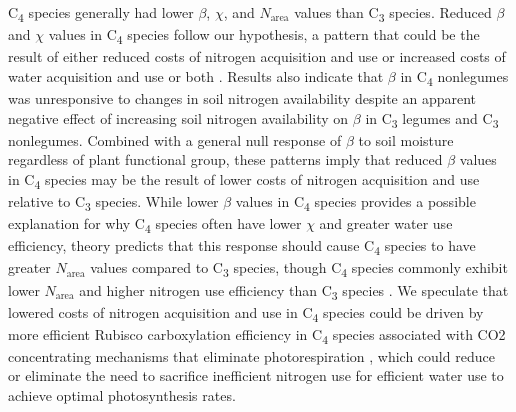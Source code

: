 C\textsubscript{4} species generally had lower $\beta$, $\chi$, and $N_\mathrm{area}$ values than C\textsubscript{3} species. Reduced $\beta$ and $\chi$ values in C\textsubscript{4} species follow our hypothesis, a pattern that could be the result of either reduced costs of nitrogen acquisition and use or increased costs of water acquisition and use or both . Results also indicate that $\beta$ in C\textsubscript{4} nonlegumes was unresponsive to changes in soil nitrogen availability despite an apparent negative effect of increasing soil nitrogen availability on $\beta$ in C\textsubscript{3} legumes and C\textsubscript{3} nonlegumes. Combined with a general null response of $\beta$ to soil moisture regardless of plant functional group, these patterns imply that reduced $\beta$ values in C\textsubscript{4} species may be the result of lower costs of nitrogen acquisition and use relative to C\textsubscript{3} species. While lower $\beta$ values in C\textsubscript{4} species provides a possible explanation for why C\textsubscript{4} species often have lower $\chi$ and greater water use efficiency, theory predicts that this response should cause C\textsubscript{4} species to have greater $N_\mathrm{area}$ values compared to C\textsubscript{3} species, though C\textsubscript{4} species commonly exhibit lower $N_\mathrm{area}$ and higher nitrogen use efficiency than C\textsubscript{3} species . We speculate that lowered costs of nitrogen acquisition and use in C\textsubscript{4} species could be driven by more efficient Rubisco carboxylation efficiency in C\textsubscript{4} species associated with CO2 concentrating mechanisms that eliminate photorespiration , which could reduce or eliminate the need to sacrifice inefficient nitrogen use for efficient water use to achieve optimal photosynthesis rates.


